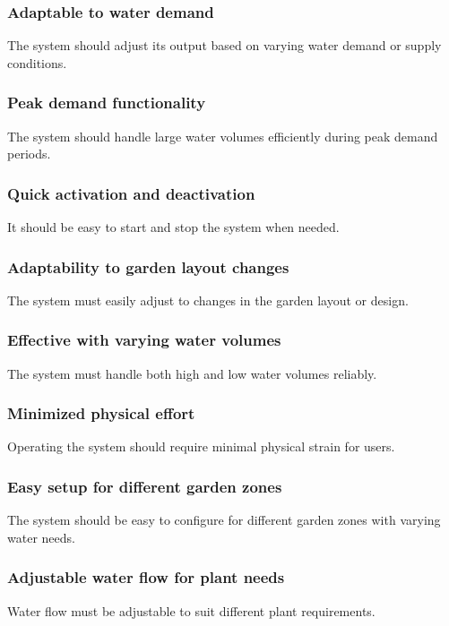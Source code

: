 \documentclass[12pt]{report}
\begin{document}
\subsubsection{Adaptable to water demand}
The system should adjust its output based on varying water demand or supply conditions.

\subsubsection{Peak demand functionality}
The system should handle large water volumes efficiently during peak demand periods.

\subsubsection{Quick activation and deactivation}
It should be easy to start and stop the system when needed.

\subsubsection{Adaptability to garden layout changes}
The system must easily adjust to changes in the garden layout or design.

\subsubsection{Effective with varying water volumes}
The system must handle both high and low water volumes reliably.

\subsubsection{Minimized physical effort}
Operating the system should require minimal physical strain for users.

\subsubsection{Easy setup for different garden zones}
The system should be easy to configure for different garden zones with varying water needs.

\subsubsection{Adjustable water flow for plant needs}
Water flow must be adjustable to suit different plant requirements.
\end{document}
